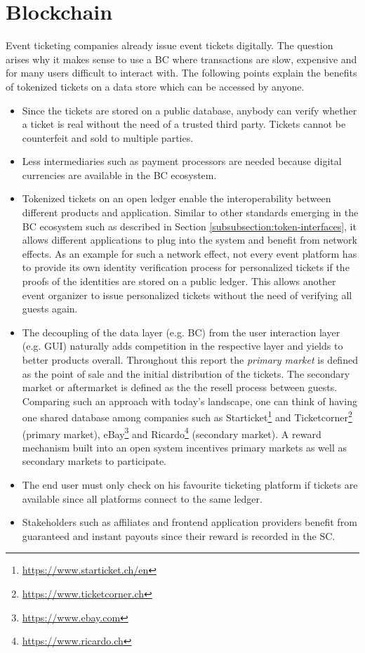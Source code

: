 \section{Blockchain}
Event ticketing companies already issue event tickets digitally. The question arises why it makes sense to use a BC where transactions are slow, expensive and for many users difficult to interact with. The following points explain the benefits of tokenized tickets on a data store which can be accessed by anyone. 

\begin{itemize}
	\item Since the tickets are stored on a public database, anybody can verify whether a ticket is real without the need of a trusted third party. Tickets cannot be counterfeit and sold to multiple parties. 
	\item Less intermediaries such as payment processors are needed because digital currencies are available in the BC ecosystem. 
	\item Tokenized tickets on an open ledger enable the interoperability between different products and application. Similar to other standards emerging in the BC ecosystem such as described in Section \ref{subsubsection:token-interfaces}, it allows different applications to plug into the system and benefit from network effects. As an example for such a network effect, not every event platform has to provide its own identity verification process for personalized tickets if the proofs of the identities are stored on a public ledger. This allows another event organizer to issue personalized tickets without the need of verifying all guests again.
	\item The decoupling of the data layer (e.g. BC) from the user interaction layer (e.g. GUI) naturally adds competition in the respective layer and yields to better products overall. Throughout this report the \textit{primary market} is defined as the point of sale and the initial distribution of the tickets. The secondary market or aftermarket is defined as the the resell process between guests. Comparing such an approach with today's landscape, one can think of having one shared database among companies such as Starticket\footnote{\url{https://www.starticket.ch/en}} and Ticketcorner\footnote{\url{https://www.ticketcorner.ch}} (primary market), eBay\footnote{\url{https://www.ebay.com}} and Ricardo\footnote{\url{https://www.ricardo.ch}} (secondary market). A reward mechanism built into an open system incentives primary markets as well as secondary markets to participate. 
	\item The end user must only check on his favourite ticketing platform if tickets are available since all platforms connect to the same ledger.
	\item Stakeholders such as affiliates and frontend application providers benefit from guaranteed and instant payouts since their reward is recorded in the SC. 
\end{itemize}

